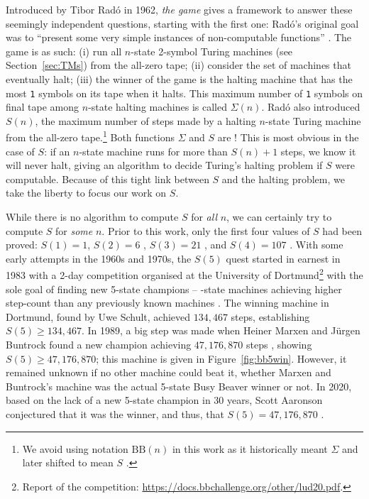 \documentclass[a4paper,british]{article}
\theoremstyle{definition} %
\numberwithin{equation}{section}
\theoremstyle{definition} %
\newcommand{\sone}{\texttt{1}\xspace}
\newcommand{\BBtheFifth}{47{,}176{,}870}
\newcommand{\radofull}{Tibor Rad\'o\xspace}
\newcommand{\rado}{Rad\'o\xspace}
\begin{document}
Introduced by \radofull in 1962, \textit{the \BBfull game} gives a framework to answer these seemingly independent questions, starting with the first one: \rado's original goal was to ``present some very simple instances of non-computable functions'' \cite{Rado_1962}. The game is as such: (i) run all $n$-state 2-symbol Turing machines (see Section~\ref{sec:TMs}) from the all-zero tape; (ii) consider the set of machines that eventually halt; (iii) the winner of the game is the halting machine that has the most \sone symbols on its tape when it halts. This maximum number of \sone symbols on final tape among $n$-state halting machines is called $\Sigma(n)$. \rado also introduced $S(n)$, the maximum number of steps made by a halting $n$-state Turing machine from the all-zero tape.\footnote{We avoid using notation $\text{BB}(n)$ in this work as it historically meant $\Sigma$ \cite{Rado_1962, 10.5555/1151785.1151794} and later shifted to mean $S$ \cite{BusyBeaverFrontier,sterin_2022_14955828}.} Both functions $\Sigma$ and $S$ are \noncomput! This is most obvious in the case of $S$: if an $n$-state machine runs for more than $S(n)+1$ steps, we know it will never halt, giving an algorithm to decide Turing's halting problem if $S$ were computable. Because of this tight link between $S$ and the halting problem, we take the liberty to focus our work on $S$.

While there is no algorithm to compute $S$ for \textit{all} $n$, we can certainly try to compute $S$ for \textit{some} $n$. Prior to this work, only the first four values of $S$ had been proved: $S(1)=1$, $S(2)=6$ \cite{Rado_1962}, $S(3) = 21$ \cite{Lin1963}, and $S(4) = 107$ \cite{Brady83}. With some early attempts in the 1960s and 1970s, the $S(5)$ quest started in earnest in 1983 with a 2-day competition organised at the University of Dortmund\footnote{Report of the competition: \url{https://docs.bbchallenge.org/other/lud20.pdf}.} with the sole goal of finding new 5-state champions -- -state machines achieving higher step-count than any previously known machines \cite{PMichel_website,michel2019busy}. The winning machine in Dortmund, found by Uwe Schult, achieved $134{,}467$ steps, establishing $S(5) \geq 134{,}467$. In 1989, a big step was made when Heiner Marxen and J\"urgen Buntrock found a new champion achieving $\BBtheFifth$ steps \cite{Marxen_1990}, showing $S(5) \geq \BBtheFifth$; this machine is given in Figure~\ref{fig:bb5win}. However, it remained unknown if no other machine could beat it, \ie whether Marxen and Buntrock's machine was the actual 5-state Busy Beaver winner or not. In 2020, based on the lack of a new 5-state champion in 30 years, Scott Aaronson conjectured that it was the winner, and thus, that $S(5) = \BBtheFifth$ \cite{BusyBeaverFrontier}.
\end{document}
